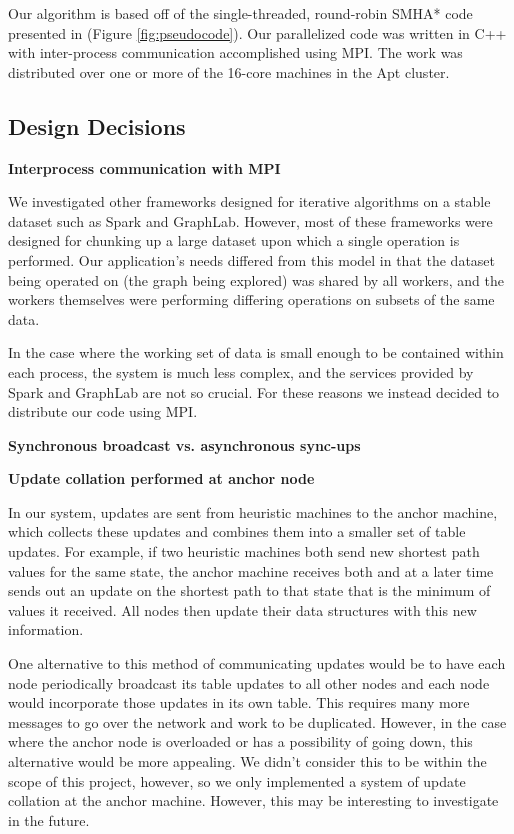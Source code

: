 \documentclass{article}
\begin{document}
Our algorithm is based off of the single-threaded, round-robin SMHA* code presented in \cite{Aine14} (Figure \ref{fig:pseudocode}). Our parallelized code was written in C++ with inter-process communication accomplished using MPI. The work was distributed over one or more of the 16-core machines in the Apt cluster. %

\subsection{Design Decisions}

\textbf{Interprocess communication with MPI}

We investigated other frameworks designed for iterative algorithms on a stable dataset such as Spark and GraphLab. However, most of these frameworks were designed for chunking up a large dataset upon which a single operation is performed. Our application's needs differed from this model in that the dataset being operated on (the graph being explored) was shared by all workers, and the workers themselves were performing differing operations on subsets of the same data.

In the case where the working set of data is small enough to be contained within each process, the system is much less complex, and the services provided by Spark and GraphLab are not so crucial. For these reasons we instead decided to distribute our code using MPI.

\textbf{Synchronous broadcast vs. asynchronous sync-ups}


\textbf{Update collation performed at anchor node}

In our system, updates are sent from heuristic machines to the anchor machine, which collects these updates and combines them into a smaller set of table updates. For example, if two heuristic machines both send new shortest path values for the same state, the anchor machine receives both and at a later time sends out an update on the shortest path to that state that is the minimum of values it received. All nodes then update their data structures with this new information. 

One alternative to this method of communicating updates would be to have each node periodically broadcast its table updates to all other nodes and each node would incorporate those updates in its own table. This requires many more messages to go over the network and work to be duplicated. However, in the case where the anchor node is overloaded or has a possibility of going down, this alternative would be more appealing. We didn't consider this to be within the scope of this project, however, so we only implemented a system of update collation at the anchor machine. However, this may be interesting to investigate in the future.
\end{document}

